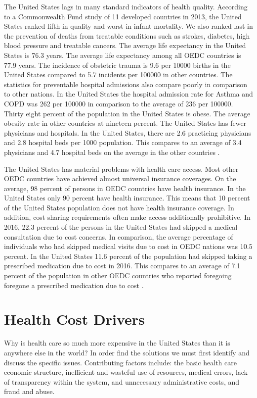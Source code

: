 \documentclass[sigconf]{acmart}
\begin{document}
The United States lags in many standard indicators of health quality.  According to a Commonwealth Fund study of 11 developed countries in 2013, the United States ranked fifth in quality and worst in infant mortality. We also ranked last in the prevention of deaths from treatable conditions such as strokes, diabetes, high blood pressure and treatable cancers.  The average life expectancy in the United States is 76.3 years.  The average life expectancy among all OEDC countries is 77.9 years.  The incidence of obstetric trauma is 9.6 per 10000 births in the United States compared to 5.7 incidents per 100000 in other countries. The statistics for preventable hospital admissions also compare poorly in comparison to other nations. In the United States the hospital admission rate for Asthma and COPD was 262 per 100000 in comparison to the average of 236 per 100000. Thirty eight percent of the population in the United States is obese. The average obesity rate in other countries at nineteen percent.  The United States has fewer physicians and hospitals.  In the United States, there are 2.6 practicing physicians and 2.8 hospital beds per 1000 population. This compares to an average of 3.4 physicians and 4.7 hospital beds on the average in the other countries \cite{OEDC}. 

The United States has material problems with health care access.  Most other OEDC countries have achieved almost universal insurance coverages. On the average, 98 percent of persons in OEDC countries have health insurance. In the United States only 90 percent have health insurance. This means that 10 percent of the United States population does not have health insurance coverage. In addition, cost sharing requirements often make access additionally prohibitive.   In 2016, 22.3 percent of the persons in the United States had skipped a medical consultation due to cost concerns. In comparison, the average percentage of individuals who had skipped medical visits due to cost in OEDC nations was 10.5 percent.  In the United States 11.6 percent of the population had skipped taking a prescribed medication due to cost in 2016. This compares to an average of 7.1 percent of the population in other OEDC countries who reported foregoing foregone a prescribed medication due to cost \cite{OEDC}.


\section{Health Cost Drivers}
Why is health care so much more expensive in the United States than it is anywhere else in the world?   In order find the solutions we must first identify and discuss the specific issues. Contributing factors include: the basic health care economic structure, inefficient and wasteful use of resources, medical errors, lack of transparency within the system, and unnecessary administrative costs, and fraud and abuse.
\end{document}
